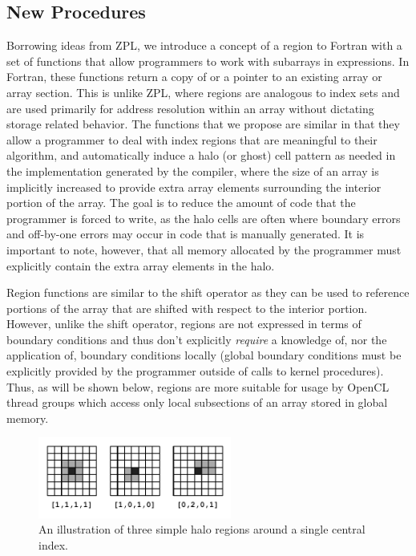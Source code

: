 \subsection{New Procedures}

Borrowing ideas from ZPL, we introduce a concept of a region to
Fortran with a set of functions that allow programmers to work with
subarrays in expressions.  In Fortran, these functions return a copy
of or a pointer to an existing array or array section.  This is unlike
ZPL, where regions are analogous to index sets and are used primarily
for address resolution within an array without dictating storage
related behavior.  The functions that we propose are similar in that
they allow a programmer to deal with index regions that are meaningful
to their algorithm, and automatically induce a halo (or ghost) cell
pattern as needed in the implementation generated by the compiler,
where the size of an array is implicitly increased to provide extra
array elements surrounding the interior portion of the array.  The
goal is to reduce the amount of code that the programmer is forced to
write, as the halo cells are often where boundary errors and
off-by-one errors may occur in code that is manually generated.  It is
important to note, however, that all memory allocated by the
programmer must explicitly contain the extra array elements in the
halo.

Region functions are similar to the shift operator as they can be used
to reference portions of the array that are shifted with respect to
the interior portion.  However, unlike the shift operator, regions are
not expressed in terms of boundary conditions and thus don't
explicitly \emph{require} a knowledge of, nor the application of,
boundary conditions locally (global boundary conditions must be
explicitly provided by the programmer outside of calls to kernel
procedures).  Thus, as will be shown below, regions are more suitable
for usage by OpenCL thread groups which access only local subsections
of an array stored in global memory.

\begin{figure}[!t]
\centering
\includegraphics[width=2.5in]{halo.pdf}
\caption{An illustration of three simple halo regions around a single central
index.}
\label{fig:halos}
\end{figure}

